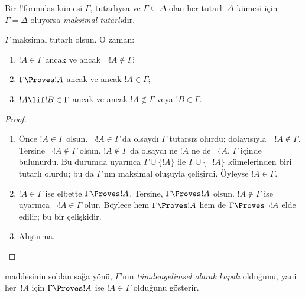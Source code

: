 \documentclass[../../../include/open-logic-section]{subfiles}
\begin{document}


\begin{defn}
Bir !!{formula}s kümesi $\Gamma$, tutarlıysa ve $\Gamma \subseteq \Delta$
olan her tutarlı $\Delta$ kümesi için $\Gamma = \Delta$ oluyorsa
\emph{maksimal tutarlı}dır.
\end{defn}

\begin{lem}
$\Gamma$ maksimal tutarlı olsun. O zaman:
\begin{enumerate}
\item {} $!A \in \Gamma$ ancak ve ancak $\lnot !A
  \notin \Gamma$;
\item {} $\Gamma \Proves !A$ ancak ve ancak $!A \in \Gamma$;
\item {} $!A \lif !B \in \Gamma$ ancak ve ancak
  $!A \notin \Gamma$ veya $!B \in \Gamma$.
\end{enumerate}
\end{lem}

\begin{proof}
\begin{enumerate}
\item Önce $!A \in \Gamma$ olsun. $\lnot !A \in \Gamma$ da olsaydı
  $\Gamma$ tutarsız olurdu; dolayısıyla $\lnot !A \notin \Gamma$.
  Tersine $\lnot !A \notin \Gamma$ olsun. $!A \notin \Gamma$ da olsaydı
  ne $!A$ ne de $\lnot !A$, $\Gamma$ içinde bulunurdu. Bu durumda
   uyarınca $\Gamma\cup\{!A\}$ ile
  $\Gamma \cup \{\lnot !A\}$ kümelerinden biri tutarlı olurdu; bu da
  $\Gamma$'nın maksimal oluşuyla çelişirdi. Öyleyse $!A \in \Gamma$.
\item $!A \in \Gamma$ ise elbette $\Gamma \Proves !A$. Tersine,
  $\Gamma \Proves !A$ olsun. $!A \notin \Gamma$ ise
   uyarınca $\lnot !A \in \Gamma$ olur. Böylece hem
  $\Gamma \Proves !A$ hem de $\Gamma \Proves \lnot !A$ elde edilir; bu
  bir çelişkidir.
\item Alıştırma.
\end{enumerate}
\end{proof}

 maddesinin soldan sağa yönü,
$\Gamma$'nın \emph{tümdengelimsel olarak kapalı} olduğunu, yani her~$!A$
için $\Gamma \Proves !A$ ise $!A \in \Gamma$ olduğunu gösterir.
\end{document}
